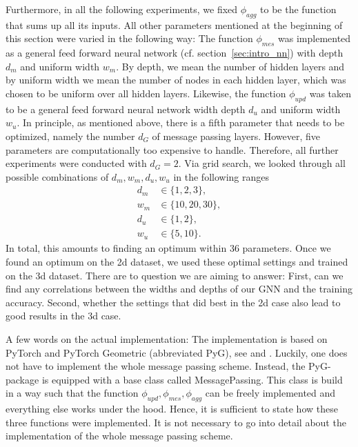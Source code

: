 Furthermore, in all the following experiments, we fixed $\phi_{agg}$ to be the function that sums up all its inputs.
All other parameters mentioned at the beginning of this section were varied in the following way:
The function $\phi_{mes}$ was implemented as a general feed forward neural network (cf. section~\ref{sec:intro_nn}) with 
depth $d_m$ and uniform width $w_m$. By depth, we mean the number of hidden layers and by uniform width we mean the number of nodes
in each hidden layer, which was chosen to be uniform over all hidden layers.
Likewise, the function $\phi_{upd}$ was taken to be a general feed forward neural network width depth $d_u$ and uniform width $w_u$.
In principle, as mentioned above, there is a fifth parameter that needs to be optimized, namely the number $d_G$ of message
passing layers. However, five parameters are computationally too expensive to handle. Therefore,
all further experiments were conducted with $d_G=2$. Via grid search, we looked through all possible combinations
of $d_m,w_m,d_u,w_u$ in the following ranges
\begin{align}
    d_m&\in\{1, 2, 3\}, \label{eq:list_settings_start} \\
    w_m&\in\{10, 20, 30\} ,\\
    d_u&\in\{1,2\}, \\
    w_u&\in\{5, 10\}.  
    \label{eq:list_settings_stop} 
\end{align}
In total, this amounts to finding an optimum within 36 parameters. Once we found an optimum on the 2d dataset, we used
these optimal settings and trained on the 3d dataset. 
There are to question we are aiming to answer: First, can we find any correlations between
the widths and depths of our GNN and the training accuracy. 
Second, whether the settings that did best in the 2d case also lead to good results in the 3d case.

A few words on the actual implementation: The implementation is based on PyTorch and PyTorch Geometric (abbreviated PyG), see \cite{PyTorch} and \cite{PyG}. 
Luckily, one does not have to implement the whole message passing scheme.
Instead, the PyG-package is equipped with a base class called MessagePassing. This class is build in a way such that
the function $\phi_{upd},\phi_{mes},\phi_{agg}$ can be freely implemented and everything else works under the hood. 
Hence, it is sufficient to state how these three functions were implemented. It is not necessary to go into 
detail about the  implementation of the whole message passing scheme.